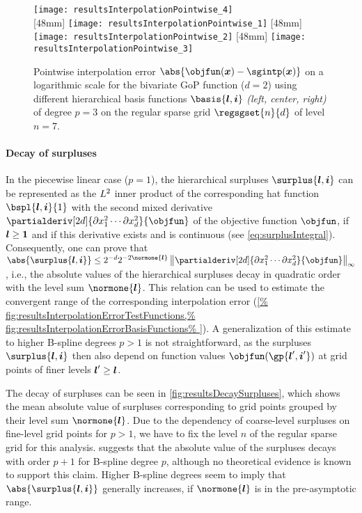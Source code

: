 \begin{figure}
  \texttt{[image: resultsInterpolationPointwise\_4]}\\[2mm]%
  [48mm]{%
    \texttt{[image: resultsInterpolationPointwise\_1]}%
  }%
  \hfill%
  [48mm]{%
    \texttt{[image: resultsInterpolationPointwise\_2]}%
  }%
  \hfill%
  [48mm]{%
    \texttt{[image: resultsInterpolationPointwise\_3]}%
  }%
  \caption[Pointwise interpolation error]{%
    Pointwise interpolation error
    $\abs{\objfun(\*x) - \sgintp(\*x)}$ on a logarithmic scale
    for the bivariate GoP function ($d = 2$)
    using different hierarchical basis functions
    $\basis{\*l,\*i}$ \emph{(left, center, right)} of degree $p = 3$ on
    the regular sparse grid $\regsgset{n}{d}$ of level $n = 7$.%
  }%
  \label{fig:resultsInterpolationErrorPointwise}%
\end{figure}

\paragraph{Decay of surpluses}

In the piecewise linear case ($p = 1$),
the hierarchical surpluses $\surplus{\*l,\*i}$
can be represented as the $L^2$ inner product of
the corresponding hat function $\bspl{\*l,\*i}{1}$ with the
second mixed derivative
$\partialderiv[2d]{\partialdiff x_1^2 \dotsm \partialdiff x_d^2}{\objfun}$
of the objective function $\objfun$,
if ${\boldsymbol{l}} \ge {\boldsymbol{1}}$ and if this derivative exists and is continuous
(see \cref{eq:surplusIntegral}).
Consequently, one can prove that
$\abs{\surplus{\*l,\*i}} \le 2^{-d} 2^{-2\normone{\*l}}
\normscaled[\infty]{
  \partialderiv[2d]{\partialdiff x_1^2 \dotsm \partialdiff x_d^2}{\objfun}
}$ \cite{Bungartz04Sparse},
i.e., the absolute values of the hierarchical surpluses
decay  in quadratic order with the level sum $\normone{\*l}$.
This relation can be used to estimate the convergent range
of the corresponding interpolation error (\cref{%
  fig:resultsInterpolationErrorTestFunctions,%
  fig:resultsInterpolationErrorBasisFunctions%
}).
A generalization of this estimate to higher B-spline degrees $p > 1$
is not straightforward, as the surpluses $\surplus{\*l,\*i}$
then also depend on function values $\objfun(\gp{\*l',\*i'})$ at
grid points of finer levels ${\boldsymbol{l}}' \ge {\boldsymbol{l}}$.

The decay of surpluses can be seen in \cref{fig:resultsDecaySurpluses},
which shows the mean absolute value of surpluses corresponding to
grid points grouped by their level sum $\normone{\*l}$.
Due to the dependency of coarse-level surpluses on fine-level grid points
for $p > 1$,
we have to fix the level $n$ of the regular sparse grid for this analysis.
 suggests that the
absolute value of the surpluses decays with order $p + 1$ for
B-spline degree $p$, although no theoretical evidence
is known to support this claim.
Higher B-spline degrees seem to imply that
$\abs{\surplus{\*l,\*i}}$ generally increases, if $\normone{\*l}$ is
in the pre-asymptotic range.

